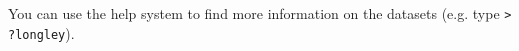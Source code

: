 
You can use the help system to find more information on the datasets (e.g. type \texttt{> ?longley}).
%

